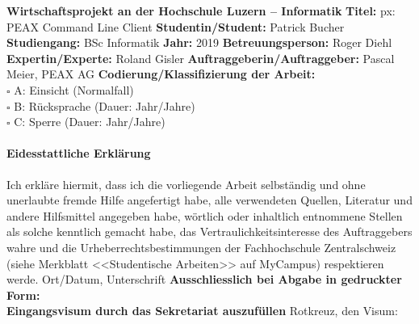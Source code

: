 \documentclass[11pt]{scrartcl}
\begin{document}
\noindent
\fontsize{12}{14}
\textbf{Wirtschaftsprojekt an der Hochschule Luzern -- Informatik} \newline \newline
\fontsize{11}{13}
\noindent
\textbf{Titel:} px: PEAX Command Line Client \newline \newline
\noindent
\textbf{Studentin/Student:} Patrick Bucher \newline \newline
\textbf{Studiengang:} BSc Informatik \newline \newline
\textbf{Jahr:} 2019 \newline \newline
\textbf{Betreuungsperson:} Roger Diehl \newline \newline
\textbf{Expertin/Experte:} Roland Gisler \newline \newline
\textbf{Auftraggeberin/Auftraggeber:} Pascal Meier, PEAX AG \newline \newline \newline
\textbf{Codierung/Klassifizierung der Arbeit:} \\
$\square$ A: Einsicht 	(Normalfall) \\
$\square$ B: Rücksprache (Dauer: \underline{\hspace*{1cm}} Jahr/Jahre)\\
$\square$ C: Sperre	(Dauer: \underline{\hspace*{1cm}} Jahr/Jahre)\\
\paragraph{\textbf{Eidesstattliche Erklärung}}
Ich erkläre hiermit, dass ich die vorliegende Arbeit selbständig und ohne unerlaubte fremde Hilfe angefertigt habe, alle verwendeten Quellen, Literatur und andere Hilfsmittel angegeben habe, wörtlich oder inhaltlich entnommene Stellen als solche kenntlich gemacht habe, das Vertraulichkeitsinteresse des Auftraggebers wahre und die Urheberrechtsbestimmungen der Fachhochschule Zentralschweiz (siehe Merkblatt <<Studentische Arbeiten>> auf MyCampus) respektieren werde. \newline \newline
Ort/Datum, Unterschrift \underline{\hspace*{8cm}} \newline \newline \newline
\textbf{Ausschliesslich bei Abgabe in gedruckter Form: \\
Eingangsvisum durch das Sekretariat auszufüllen}\newline \newline
Rotkreuz, den \underline{\hspace*{4cm}}	\hspace*{1cm} Visum: \underline{\hspace*{4cm}}
\end{document}
